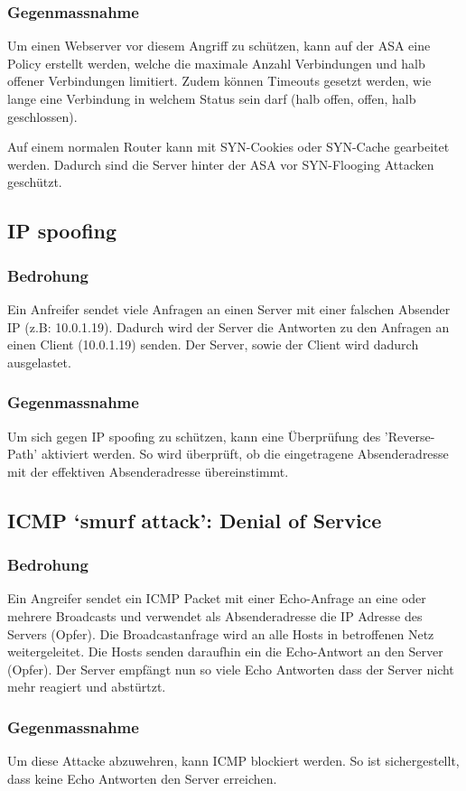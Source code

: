 \documentclass[11pt,a4paper,parskip=half]{scrartcl}
\begin{document}
\subsubsection{Gegenmassnahme}
Um einen Webserver vor diesem Angriff zu schützen, kann auf der ASA eine Policy erstellt werden, welche die maximale Anzahl Verbindungen und halb offener Verbindungen limitiert. Zudem können Timeouts gesetzt werden, wie lange eine Verbindung in welchem Status sein darf (halb offen, offen, halb geschlossen).

Auf einem normalen Router kann mit SYN-Cookies oder SYN-Cache gearbeitet werden. Dadurch sind die Server hinter der ASA vor SYN-Flooging Attacken geschützt.

\subsection{IP spoofing}
\subsubsection{Bedrohung}
Ein Anfreifer sendet viele Anfragen an einen Server mit einer falschen Absender IP (z.B: 10.0.1.19). Dadurch wird der Server die Antworten zu den Anfragen an einen Client (10.0.1.19) senden. Der Server, sowie der Client wird dadurch ausgelastet.
\subsubsection{Gegenmassnahme}
Um sich gegen IP spoofing zu schützen, kann eine Überprüfung des 'Reverse-Path' aktiviert werden. So wird überprüft, ob die eingetragene Absenderadresse mit der effektiven Absenderadresse übereinstimmt.

\subsection{ICMP ‘smurf attack’: Denial of Service}
\subsubsection{Bedrohung}
Ein Angreifer sendet ein ICMP Packet mit einer Echo-Anfrage an eine oder mehrere Broadcasts und verwendet als Absenderadresse die IP Adresse des Servers (Opfer). Die Broadcastanfrage wird an alle Hosts in betroffenen Netz weitergeleitet. Die Hosts senden daraufhin ein die Echo-Antwort an den Server (Opfer). Der Server empfängt nun so viele Echo Antworten dass der Server nicht mehr reagiert und abstürtzt.
\subsubsection{Gegenmassnahme}
Um diese Attacke abzuwehren, kann ICMP blockiert werden. So ist sichergestellt, dass keine Echo Antworten den Server erreichen.
\end{document}
